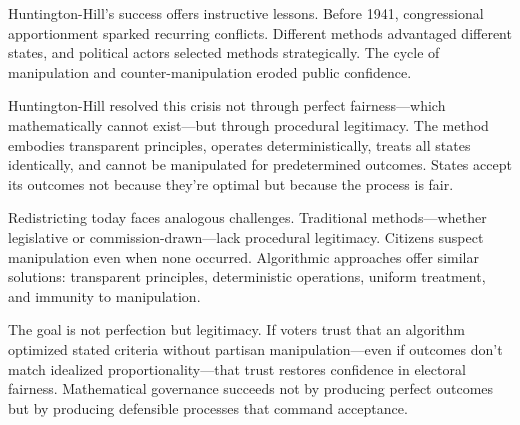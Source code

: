 Huntington-Hill's success offers instructive lessons. Before 1941, congressional apportionment sparked recurring conflicts. Different methods advantaged different states, and political actors selected methods strategically. The cycle of manipulation and counter-manipulation eroded public confidence.

Huntington-Hill resolved this crisis not through perfect fairness—which mathematically cannot exist—but through procedural legitimacy. The method embodies transparent principles, operates deterministically, treats all states identically, and cannot be manipulated for predetermined outcomes. States accept its outcomes not because they're optimal but because the process is fair.

Redistricting today faces analogous challenges. Traditional methods—whether legislative or commission-drawn—lack procedural legitimacy. Citizens suspect manipulation even when none occurred. Algorithmic approaches offer similar solutions: transparent principles, deterministic operations, uniform treatment, and immunity to manipulation.

The goal is not perfection but legitimacy. If voters trust that an algorithm optimized stated criteria without partisan manipulation—even if outcomes don't match idealized proportionality—that trust restores confidence in electoral fairness. Mathematical governance succeeds not by producing perfect outcomes but by producing defensible processes that command acceptance.

